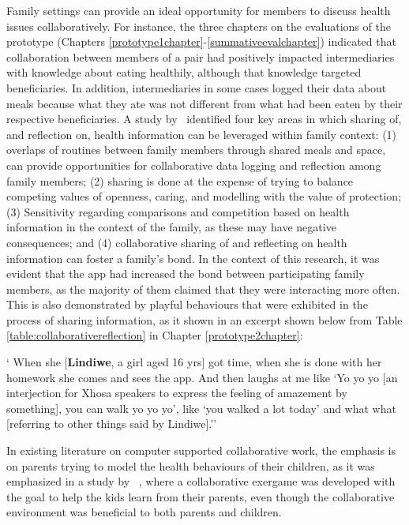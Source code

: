 Family settings can provide an ideal opportunity for members to discuss health issues collaboratively. For instance, the three chapters on the evaluations of the prototype (Chapters \ref{prototype1chapter}\thinspace-\thinspace\ref{summativeevalchapter}) indicated that collaboration between members of a pair had positively impacted intermediaries with knowledge about eating healthily, although that knowledge targeted beneficiaries. In addition, intermediaries in some cases logged their data about meals because what they ate was not different from what had been eaten by their respective beneficiaries. A study by~\cite{grimes2009toward} identified four key areas in which sharing of, and reflection on, health information can be leveraged within family context: (1) overlaps of routines between family members through shared meals and space, can provide opportunities for collaborative data logging and reflection among family members; (2) sharing is done at the expense of trying to balance competing values of openness, caring, and modelling with the value of protection; (3) Sensitivity regarding comparisons and competition based on health information in the context of the family, as these may have negative consequences; and (4) collaborative sharing of and reflecting on health information can foster a family's bond. In the context of this research, it was evident that the app had increased the bond between participating family members, as the majority of them claimed that they were interacting more often. This is also demonstrated by playful behaviours that were exhibited in the process of sharing information, as it shown in an excerpt shown below from Table \ref{table:collaborativereflection} in Chapter \ref{prototype2chapter}:

 {` When she [\textbf{Lindiwe}, a girl aged 16 yrs] got time, when she is done with her homework she comes and sees the app. And then laughs at me like `Yo yo yo [an interjection for Xhosa speakers to express the feeling of amazement by something], you can walk yo yo yo', like `you walked a lot today' and what what [referring to other things said by Lindiwe].''}

In existing literature on computer supported collaborative work, the emphasis is on parents trying to model the health behaviours of their children, as it was emphasized in a study by ~\cite{saksono2015spaceship}, where a collaborative exergame was developed with the goal to help the kids learn from their parents, even though the collaborative environment was beneficial to both parents and children.  


